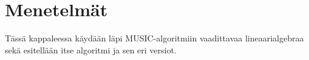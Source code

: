 \section{Menetelmät}
Tässä kappaleessa käydään läpi MUSIC-algoritmiin vaadittavaa lineaarialgebraa sekä esitellään itse algoritmi ja sen eri versiot.









